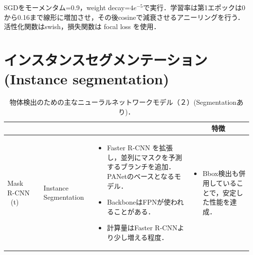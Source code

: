 \documentclass[originalpaper,fleqn]{jsaiart}     %
\begin{document}
SGDをモーメンタム=0.9，weight decay=$4e^{-5}$で実行．学習率は第1エポックは0から0.16まで線形に増加させ，その後cosineで減衰させるアニーリングを行う．活性化関数はswish，損失関数は focal loss を使用．


\section{インスタンスセグメンテーション(Instance segmentation)}
\begin{table}
    \caption{物体検出のための主なニューラルネットワークモデル（２）(Segmentationあり)．}
    \label{tbl-cheat2}
    \begin{center}
        \setlength{\tabcolsep}{3pt}
        \footnotesize
        \begin{tabularx}{\linewidth}{Xp{1.5cm}Xp{7cm}X} \toprule
            \centering{モデル名称} & \centering{文献} & \centering{用途} & \centering{概要} & \multicolumn{1}{c}{特徴} \\ \midrule

            Mask R-CNN \ (t)\footnote[1] & \cite{HGDG17} & Instance Segmentation & 
            \begin{itemize}
                \vspace{-0.7\baselineskip}
                \setlength{\leftskip}{-3mm}
                \item Faster R-CNN を拡張し，並列にマスクを予測するブランチを追加．PANetのベースとなるモデル．
                \item BackboneはFPNが使われることがある．
                \item 計算量はFaster R-CNNより少し増える程度．
            \end{itemize}
            &
            \begin{itemize}
                \vspace{-0.7\baselineskip}
                \setlength{\leftskip}{-3mm}
                \item Bbox検出も併用していることで，安定した性能を達成．
            \end{itemize}
            \\


\end{tabularx}
\end{center}
\end{table}
\end{document}
